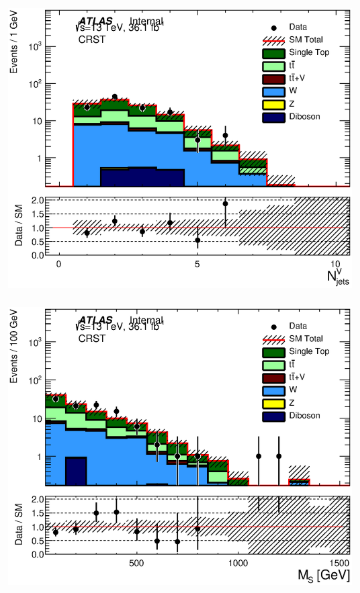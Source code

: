 \begin{figure}[h!]
\begin{center}
\begin{subfigure}[b]{0.40\textwidth}
    	 \includegraphics[width=\textwidth]{figures/plotRegion/CA_NjV_CRST_log.eps}
                \caption{ }
    \end{subfigure}
    \begin{subfigure}[b]{0.40\textwidth}    
    	 \includegraphics[width=\textwidth]{figures/plotRegion/CA_MS_CRST_log.eps}
                \caption{ }
    \end{subfigure}
    \begin{subfigure}[b]{0.40\textwidth}    

\end{subfigure}
\end{center}
\end{figure}
